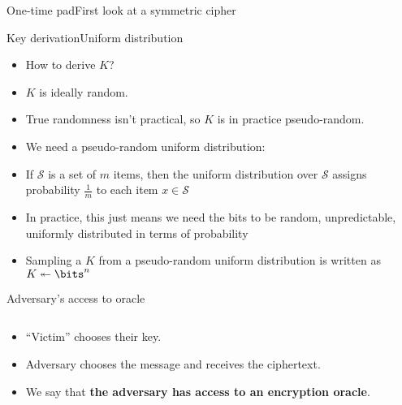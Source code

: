 \documentclass[aspectratio=169, lualatex, handout]{beamer}
\begin{document}
\begin{frame}{One-time pad}{First look at a symmetric cipher}
\end{frame}

\begin{frame}{Key derivation}{Uniform distribution}
	\begin{itemize}[<+->]
		\item How to derive $K$?
		\item $K$ is ideally random.
		\item True randomness isn’t practical, so $K$ is in practice pseudo-random.
		\item We need a pseudo-random uniform distribution:
		\item If $\mathcal{S}$ is a set of $m$ items, then the uniform distribution over $\mathcal{S}$ assigns probability $\frac{1}{m}$ to each item $x \in \mathcal{S}$
		\item In practice, this just means we need the bits to be random, unpredictable, uniformly distributed in terms of probability
		\item Sampling a $K$ from a pseudo-random uniform distribution is written as $K \twoheadleftarrow \bits^n$
	\end{itemize}
\end{frame}

\begin{frame}{Adversary's access to oracle}
	\begin{columns}[c]
		\begin{column}{0.5\textwidth}
			\begin{itemize}[<+->]
				\item ``Victim'' chooses their key.
				\item Adversary chooses the message and receives the ciphertext.
				\item We say that \textbf{the adversary has access to an encryption oracle}.
			\end{itemize}
		\end{column}
		\begin{column}{0.5\textwidth}
		\end{column}
	\end{columns}
\end{frame}
\end{document}
